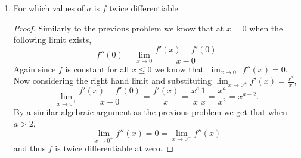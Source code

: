 \documentclass[12pt]{article}
\makeatletter
\theoremstyle{homework}
\newenvironment{exercise}[1]
{\def\@currentlabel{#1}\exercisecore}
{\endexercisecore}
\makeatother
\begin{document}
\begin{exercise}{Abbott 5.2.5}
\begin{enumerate}
    \item For which values of $a$ is $f$ twice differentiable\\
    \begin{proof}
      Similarly to the previous problem we know that at $x = 0$ when the following limit exists,
      \begin{equation*}
        f''(0) = \lim_{x \to 0} \dfrac{f'(x) - f'(0)}{x - 0}
      \end{equation*}
      Again since $f$ is constant for all $x \le 0$ we know that $\lim_{x \to 0^-} f''(x) = 0$. Now considering the right hand limit and substituting $\lim_{x \to 0^+} f'(x) = \frac{x^a}{x}$,
      \begin{equation*}
        \lim_{x \to 0^+}  \dfrac{f'(x) - f'(0)}{x - 0} =  \dfrac{f'(x)}{x} =\dfrac{x^a}{x}\dfrac{1}{x} = \dfrac{x^a}{x^2} = x^{a-2}.  
      \end{equation*}
      By a similar algebraic argument as the previous problem we get that when $a > 2$,
        \begin{equation*}
          \lim_{x \to 0^+} f''(x)  = 0  = \lim_{x\to 0^-} f''(x) 
        \end{equation*}
        and thus $f$ is twice differentiable at zero. 


    \end{proof}

  \end{enumerate}

\end{exercise}
\vspace{.5in}
\end{document}
